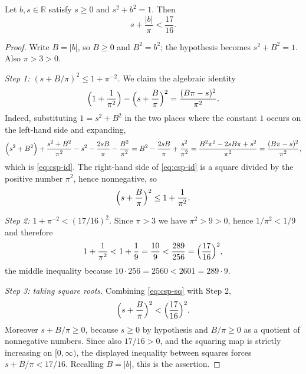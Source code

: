 \begin{lemma}
Let $b,s\in\mathbb{R}$ satisfy $s\ge0$ and $s^2+b^2=1$. Then
\[
  s+\frac{\lvert b\rvert}{\pi}<\frac{17}{16}.
\]
\end{lemma}
\begin{proof}
Write $B=\lvert b\rvert$, so $B\ge0$ and $B^2=b^2$; the hypothesis becomes
$s^2+B^2=1$. Also $\pi>3>0$.

\emph{Step 1: $(s+B/\pi)^2\le1+\pi^{-2}$.} We claim the algebraic identity
\begin{equation}\label{eq:csp-id}
  \Bigl(1+\frac1{\pi^2}\Bigr)-\Bigl(s+\frac{B}{\pi}\Bigr)^2
  =\frac{(B\pi-s)^2}{\pi^2}.
\end{equation}
Indeed, substituting $1=s^2+B^2$ in the two places where the constant $1$
occurs on the left-hand side and expanding,
\[
  \Bigl(s^2+B^2\Bigr)+\frac{s^2+B^2}{\pi^2}
   -s^2-\frac{2sB}{\pi}-\frac{B^2}{\pi^2}
  =B^2-\frac{2sB}{\pi}+\frac{s^2}{\pi^2}
  =\frac{B^2\pi^2-2sB\pi+s^2}{\pi^2}
  =\frac{(B\pi-s)^2}{\pi^2},
\]
which is \eqref{eq:csp-id}. The right-hand side of \eqref{eq:csp-id} is a square
divided by the positive number $\pi^2$, hence nonnegative, so
\begin{equation}\label{eq:csp-sq}
  \Bigl(s+\frac{B}{\pi}\Bigr)^2\le1+\frac1{\pi^2}.
\end{equation}

\emph{Step 2: $1+\pi^{-2}<(17/16)^2$.} Since $\pi>3$ we have $\pi^2>9>0$, hence
$1/\pi^2<1/9$ and therefore
\[
  1+\frac1{\pi^2}<1+\frac19=\frac{10}{9}
  <\frac{289}{256}=\Bigl(\frac{17}{16}\Bigr)^2,
\]
the middle inequality because $10\cdot256=2560<2601=289\cdot9$.

\emph{Step 3: taking square roots.} Combining \eqref{eq:csp-sq} with Step 2,
\[
  \Bigl(s+\frac{B}{\pi}\Bigr)^2<\Bigl(\frac{17}{16}\Bigr)^2 .
\]
Moreover $s+B/\pi\ge0$, because $s\ge0$ by hypothesis and $B/\pi\ge0$ as a
quotient of nonnegative numbers. Since also $17/16>0$, and the squaring map is
strictly increasing on $[0,\infty)$, the displayed inequality between squares
forces $s+B/\pi<17/16$. Recalling $B=\lvert b\rvert$, this is the assertion.
\end{proof}
